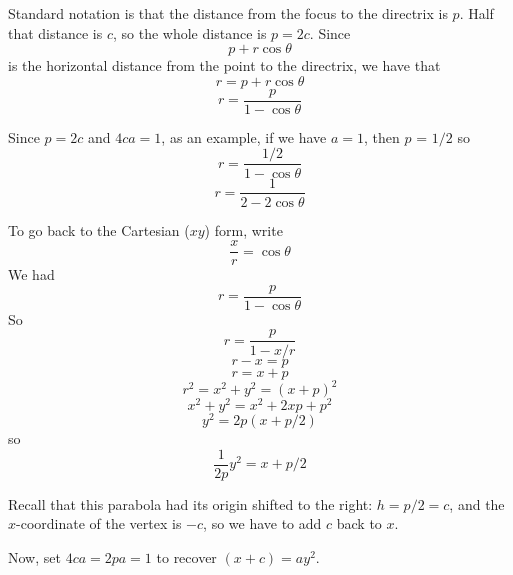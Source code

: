 \documentclass[11pt, oneside]{article}
\begin{document}
Standard notation is that the distance from the focus to the directrix is $p$.  Half that distance is $c$, so the whole distance is $p = 2c$.  Since
\[ p + r \cos \theta \]
is the horizontal distance from the point to the directrix, we have that
\[ r = p + r \cos \theta \]
\[ r = \frac{p}{1- \cos \theta} \]

Since $p = 2c$ and $4ca = 1$, as an example, if we have $a=1$, then $p$ = $1/2$ so
\[ r = \frac{1/2}{1- \cos \theta} \]
\[ r = \frac{1}{2- 2 \cos \theta} \]

To go back to the Cartesian ($xy$) form, write
\[ \frac{x}{r} = \cos \theta \]
We had
\[ r = \frac{p}{1- \cos \theta} \]
So
\[ r = \frac{p}{1- x/r} \]
\[ r - x = p \]
\[ r = x + p \]
\[ r^2 = x^2 + y^2 = (x + p)^2 \]
\[ x^2 + y^2 = x^2 + 2xp + p^2 \]
\[ y^2 = 2p(x + p/2) \]
so
\[ \frac{1}{2p} y^2 = x + p/2 \]

Recall that this parabola had its origin shifted to the right:  $h = p/2 = c$, and the $x$-coordinate of the vertex is $-c$, so we have to add $c$ back to $x$.

Now, set $4ca = 2pa = 1$ to recover $(x+c) = ay^2$.
\end{document}
